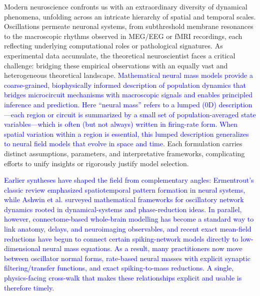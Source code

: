 \documentclass[12pt]{article}
\numberwithin{equation}{section}
\newcommand{\rev}[1]{\textcolor{blue}{#1}}
\begin{document}
Modern neuroscience confronts us with an extraordinary diversity of dynamical phenomena, unfolding across an intricate hierarchy of spatial and temporal scales. Oscillations permeate neuronal systems, from subthreshold membrane resonances to the macroscopic rhythms observed in MEG/EEG or fMRI recordings, each reflecting underlying computational roles or pathological signatures. As experimental data accumulate, the theoretical neuroscientist faces a critical challenge: bridging these empirical observations with an equally vast and heterogeneous theoretical landscape. \rev{Mathematical neural mass models provide a coarse-grained, biophysically informed description of population dynamics that bridges microcircuit mechanisms with macroscopic signals and enables principled inference and prediction. Here “neural mass” refers to a lumped (0D) description—each region or circuit is summarized by a small set of population-averaged state variables—which is often (but not always) written in firing-rate form. When spatial variation within a region is essential, this lumped description generalizes to neural field models that evolve in space and time.} Each formulation carries distinct assumptions, parameters, and interpretative frameworks, complicating efforts to unify insights or rigorously justify model selection.

\rev{Earlier syntheses have shaped the field from complementary angles: Ermentrout’s classic review emphasized spatiotemporal pattern formation in neural systems, while Ashwin et al. surveyed mathematical frameworks for oscillatory network dynamics rooted in dynamical-systems and phase-reduction ideas. In parallel, however, connectome-based whole-brain modelling has become a standard way to link anatomy, delays, and neuroimaging observables, and recent exact mean-field reductions have begun to connect certain spiking-network models directly to low-dimensional neural mass equations. As a result, many practitioners now move between oscillator normal forms, rate-based neural masses with explicit synaptic filtering/transfer functions, and exact spiking-to-mass reductions. A single, physics-facing cross-walk that makes these relationships explicit and usable is therefore timely. \cite{ashwin2016mathematical, ermentrout1998neural}}
\end{document}
